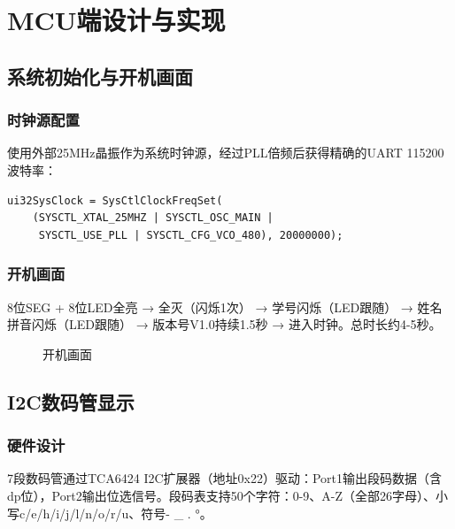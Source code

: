\documentclass[12pt,hyperref,a4paper,UTF8]{ctexart}
\begin{document}
\section{MCU端设计与实现}

\subsection{系统初始化与开机画面}

\subsubsection{时钟源配置}

使用外部25MHz晶振作为系统时钟源，经过PLL倍频后获得精确的UART 115200波特率：

\begin{verbatim}
ui32SysClock = SysCtlClockFreqSet(
    (SYSCTL_XTAL_25MHZ | SYSCTL_OSC_MAIN |
     SYSCTL_USE_PLL | SYSCTL_CFG_VCO_480), 20000000);
\end{verbatim}

\subsubsection{开机画面}

8位SEG + 8位LED全亮 → 全灭（闪烁1次） → 学号闪烁（LED跟随）
→ 姓名拼音闪烁（LED跟随） → 版本号V1.0持续1.5秒 → 进入时钟。总时长约4-5秒。

\begin{figure}[!htbp]
    \centering
    \caption{开机画面}
    \label{fig:boot}
\end{figure}

\subsection{I2C数码管显示}

\subsubsection{硬件设计}

7段数码管通过TCA6424 I2C扩展器（地址0x22）驱动：Port1输出段码数据（含dp位），Port2输出位选信号。段码表支持50个字符：0-9、A-Z（全部26字母）、小写c/e/h/i/j/l/n/o/r/u、符号- \_ . °。
\end{document}
